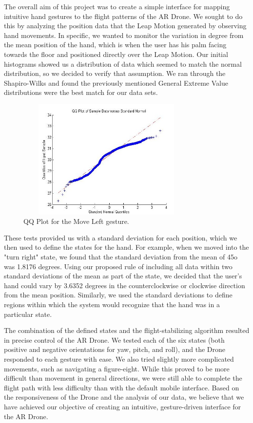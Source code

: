 \documentclass[letterpaper,english, 12pt]{article}
\begin{document}
The overall aim of this project was to create a simple interface for mapping intuitive hand gestures to the flight patterns of the AR Drone. We sought to do this by analyzing the position data that the Leap Motion generated by observing hand movements. In specific, we wanted to monitor the variation in degree from the mean position of the hand, which is when the user has his palm facing towards the floor and positioned directly over the Leap Motion. Our initial histograms showed us a distribution of data which seemed to match the normal distribution, so we decided to verify that assumption. We ran through the Shapiro-Wilks and found the previously mentioned General Extreme Value distributions were the best match for our data sets.

\begin{figure}[H]
	\centering
	\includegraphics[height=6cm,width=90mm]{pics/qqLeft.jpg}
	\caption{QQ Plot for the Move Left gesture.}
\end{figure}

These tests provided us with a standard deviation for each position, which we then used to define the states for the hand. For example, when we moved into the "turn right" state, we found that the standard deviation from the mean of 45o was 1.8176 degrees. Using our proposed rule of including all data within two standard deviations of the mean as part of the state, we decided that the user's hand could vary by 3.6352 degrees in the counterclockwise or clockwise direction from the mean position. Similarly, we used the standard deviations to define regions within which the system would recognize that the hand was in a particular state.

The combination of the defined states and the flight-stabilizing algorithm resulted in precise control of the AR Drone. We tested each of the six states (both positive and negative orientations for yaw, pitch, and roll), and the Drone responded to each gesture with ease. We also tried slightly more complicated movements, such as navigating a figure-eight. While this proved to be more difficult than movement in general directions, we were still able to complete the flight path with less difficulty than with the default mobile interface. Based on the responsiveness of the Drone and the analysis of our data, we believe that we have achieved our objective of creating an intuitive, gesture-driven interface for the AR Drone.
\end{document}
